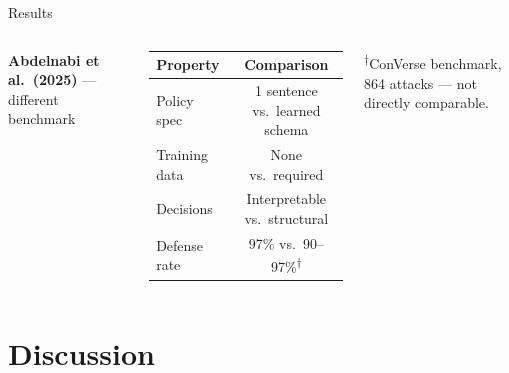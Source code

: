 \documentclass[aspectratio=169, 10pt]{beamer}
\begin{document}
\begin{frame}{Results}
\begin{columns}[T]
      \vspace{0.5em}
      \textbf{Abdelnabi et al.\ (2025)} {\scriptsize— different benchmark}

      \smallskip
      \begin{tabular}{@{}lc@{}}
        \toprule
        \textbf{Property} & \textbf{Comparison} \\
        \midrule
        Policy spec    & 1 sentence vs.\ learned schema \\
        Training data  & None vs.\ required \\
        Decisions      & Interpretable vs.\ structural \\
        \midrule
        Defense rate   & 97\% vs.\ 90--97\%\textsuperscript{†} \\
        \bottomrule
      \end{tabular}

      {\scriptsize\textsuperscript{†}ConVerse benchmark, 864 attacks — not directly comparable.}
    \end{columns}

\end{frame}

\section{Discussion}
\end{document}
